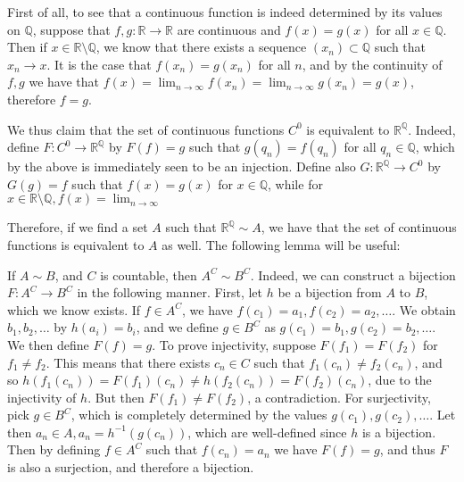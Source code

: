 \begin{solution}
    
    First of all, to see that a continuous function is indeed determined by its values on $\mathbb{Q}$, suppose that $f, g: \mathbb{R} \rightarrow \mathbb{R}$ are continuous and $f(x) = g(x)$ for all $x \in \mathbb{Q}$.
    Then if $x \in \mathbb{R} \setminus \mathbb{Q}$, we know that there exists a sequence $(x_n) \subset \mathbb{Q}$ such that $x_n \rightarrow x$.
    It is the case that $f(x_n) = g(x_n)$ for all $n$, and by the continuity of $f, g$ we have that $f(x) = \lim_{n \rightarrow \infty} f(x_n) = \lim_{n \rightarrow \infty} g(x_n) = g(x)$, therefore $f = g$.

    We thus claim that the set of continuous functions $C^0$ is equivalent to $\mathbb{R}^{\mathbb{Q}}$.
    Indeed, define $F: C^0 \rightarrow \mathbb{R}^{\mathbb{Q}}$ by $F(f) = g$ such that $g(q_n) = f(q_n)$ for all $q_n \in \mathbb{Q}$, which by the above is immediately seen to be an injection.
    Define also $G: \mathbb{R}^{\mathbb{Q}} \rightarrow C^0$ by $G(g) = f$ such that $f(x) = g(x)$ for $x \in \mathbb{Q}$, while for $x \in \mathbb{R} \setminus \mathbb{Q}, f(x) = \lim_{n \rightarrow \infty}$

    Therefore, if we find a set $A$ such that $\mathbb{R}^{\mathbb{Q}} \sim A$, we have that the set of continuous functions is equivalent to $A$ as well.
    The following lemma will be useful: 
    
    If $A \sim B$, and $C$ is countable, then $A^{C} \sim B^{C}$.
    Indeed, we can construct a bijection $F: A^{C} \rightarrow B^{C}$ in the following manner.
    First, let $h$ be a bijection from $A$ to $B$, which we know exists.
    If $f \in A^{C}$, we have $f(c_1) = a_1, f(c_2) = a_2, \ldots$.
    We obtain $b_1, b_2, \ldots$ by $h(a_i) = b_i$, and we define $g \in B^{C}$ as $g(c_1) = b_1, g(c_2) = b_2, \ldots$.
    We then define $F(f) = g$.
    To prove injectivity, suppose $F(f_1) = F(f_2)$ for $f_1 \neq f_2$.
    This means that there exists $c_n \in C$ such that $f_1(c_n) \neq f_2(c_n)$, and so $h(f_1(c_n)) = F(f_1)(c_n) \neq h(f_2(c_n)) = F(f_2)(c_n)$, due to the injectivity of $h$.
    But then $F(f_1) \neq F(f_2)$, a contradiction.
    For surjectivity, pick $g \in B^{C}$, which is completely determined by the values $g(c_1), g(c_2), \ldots$.
    Let then $a_n \in A, a_n = h^{-1}(g(c_n))$, which are well-defined since $h$ is a bijection.
    Then by defining $f \in A^{C}$ such that $f(c_n) = a_n$ we have $F(f) = g$, and thus $F$ is also a surjection, and therefore a bijection.


\end{solution}
